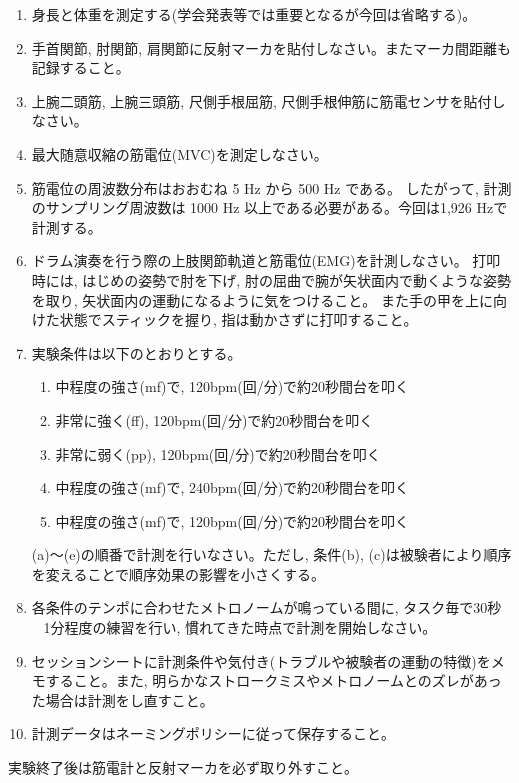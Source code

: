 \documentclass{ltjsarticle}
\begin{document}
\begin{enumerate}
\item 身長と体重を測定する(学会発表等では重要となるが今回は省略する)。
\item 手首関節, 肘関節, 肩関節に反射マーカを貼付しなさい。またマーカ間距離も記録すること。
\item 上腕二頭筋, 上腕三頭筋, 尺側手根屈筋, 尺側手根伸筋に筋電センサを貼付しなさい。
\item 最大随意収縮の筋電位(MVC)を測定しなさい。
\item 筋電位の周波数分布はおおむね 5 Hz から 500 Hz である。
したがって, 計測のサンプリング周波数は 1000 Hz 以上である必要がある。今回は1,926 Hzで計測する。
\item ドラム演奏を行う際の上肢関節軌道と筋電位(EMG)を計測しなさい。
      打叩時には, はじめの姿勢で肘を下げ, 肘の屈曲で腕が矢状面内で動くような姿勢を取り, 矢状面内の運動になるように気をつけること。
      また手の甲を上に向けた状態でスティックを握り, 指は動かさずに打叩すること。
\item 実験条件は以下のとおりとする。
  \begin{enumerate}
    \item 中程度の強さ(mf)で, 120bpm(回/分)で約20秒間台を叩く %
    \item 非常に強く(ff), 120bpm(回/分)で約20秒間台を叩く %
    \item 非常に弱く(pp), 120bpm(回/分)で約20秒間台を叩く %
    \item 中程度の強さ(mf)で, 240bpm(回/分)で約20秒間台を叩く %
    \item 中程度の強さ(mf)で, 120bpm(回/分)で約20秒間台を叩く
  \end{enumerate}
  (a)〜(e)の順番で計測を行いなさい。ただし, 条件(b), (c)は被験者により順序を変えることで順序効果の影響を小さくする。
\item 各条件のテンポに合わせたメトロノームが鳴っている間に, タスク毎で30秒 ~ 1分程度の練習を行い, 慣れてきた時点で計測を開始しなさい。
\item セッションシートに計測条件や気付き(トラブルや被験者の運動の特徴)をメモすること。また, 明らかなストロークミスやメトロノームとのズレがあった場合は計測をし直すこと。
\item 計測データはネーミングポリシーに従って保存すること。
\end{enumerate}
実験終了後は筋電計と反射マーカを必ず取り外すこと。
\end{document}

